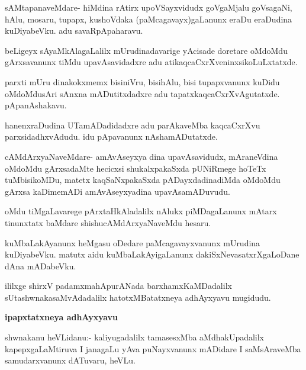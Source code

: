 \begin{mng}
sAMtapanaveMdare- hiMdina rAtirx upoVSayxvidudx goVgaMjalu goVsagaNi, hAlu, mosaru, tupapx, kushoVdaka (paMcagavayx)gaLanunx eraDu eraDudina kuDiyabeVku. adu savaRpApaharavu.
\end{mng}

\begin{mng}
beLigeyx sAyaMkAlagaLalilx mUrudinadavarige yAcisade doretare oMdoMdu gArxsavanunx tiMdu upavAsavidadxre adu atikaqcaCxrXveninxsikoLuLxtatxde.
\end{mng}

\begin{mng}
parxti mUru dinakokxmemx bisiniVru, bisihAlu, bisi tupapxvanunx kuDidu oMdoMdusAri sAnxna mADutitxdadxre adu tapatxkaqcaCxrXvAgutatxde. pApanAshakavu.
\end{mng}

\begin{mng}
hanenxraDudina UTamADadidadxre adu parAkaveMba kaqcaCxrXvu parxsidadhxvAdudu. idu pApavanunx nAshamADutatxde.
\end{mng}

\begin{mng}
cAMdArxyaNaveMdare- amAvAseyxya dina upavAsavidudx, mAraneVdina oMdoMdu gArxsadaMte hecicxsi shukalxpakaSxda pUNiRmege hoTeTx tuMbisikoMDu, matetx kaqSaNxpakaSxda pADayxdadinadiMda oMdoMdu gArxsa kaDimemADi amAvAseyxyadina upavAsamADuvudu.
\end{mng}

\begin{mng}
oMdu tiMgaLavarege pArxtaHkAladalilx nAlukx piMDagaLanunx mAtarx tinunxtatx baMdare shishucAMdArxyaNaveMdu hesaru.
\end{mng}

\begin{mng}
kuMbaLakAyanunx heMgasu oDedare paMcagavayxvanunx mUrudina kuDiyabeVku. matutx aidu kuMbaLakAyigaLanunx dakiSxNevasatxrXgaLoDane dAna mADabeVku.
\end{mng}
ililxge shirxV padamxmahApurANada barxhamxKaMDadalilx sUtashwnakasaMvAdadalilx hatotxMBatatxneya adhAyxyavu mugidudu.

\begin{center}
\textbf{\large ipapxtatxneya adhAyxyavu}
\end{center}

\begin{mng}
shwnakanu heVLidanu:- kaliyugadalilx tamasesxMba aMdhakUpadalilx kapepxgaLaMtiruva I janagaLu yAva puNayxvanunx mADidare I saMsAraveMba samudarxvanunx dATuvaru, heVLu.
\end{mng}

